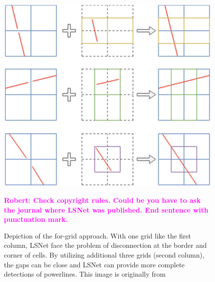 \documentclass[journal]{IEEEtran}
\newcommand{\commentR}[1]{\textbf{\textcolor{magenta}{Robert: #1}}}
\begin{document}
\begin{figure}
  \includegraphics[width=\linewidth]{imgs/others/4grid.png}
  \caption{Depiction of the for-grid approach. With one grid like the first column, LSNet face the problem of disconnection at the border and corner of cells. By utilizing additional three grids (second column), the gaps can be close and LSNet can provide more complete detections of powerlines. This image is originally from \cite{Nguyen2020}} \commentR{Check copyright rules. Could be you have to ask the journal where LSNet was published. End sentence with punctuation mark.}
  \label{4grid}
\end{figure}
\end{document}
